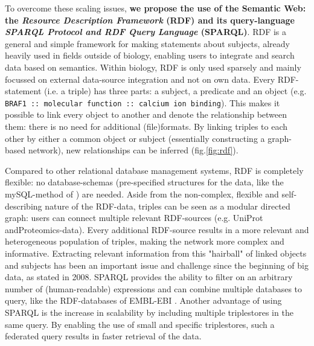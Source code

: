 \documentclass[twoside,fontsize=12pt]{article}
\begin{document}
\noindent
To overcome these scaling issues, \textbf{we propose the use of the Semantic Web: the \textit{Resource Description Framework} (RDF) and its query-language \textit{SPARQL Protocol and RDF Query Language} (SPARQL)}. RDF is a general and simple framework for making statements about subjects, already heavily used in fields outside of biology, enabling users to integrate and search data based on semantics. Within biology, RDF is only used sparsely and mainly focussed on external data-source integration and not on own data\cite{Belleau2008,Neumann2006,Sahoo2008}. Every RDF-statement (i.e. a triple) has three parts: a subject, a predicate and an object (e.g. \lstinline|BRAF1 :: molecular function :: calcium ion binding|). This makes it possible to link every object to another and denote the relationship between them: there is no need for additional (file)formats. By linking triples to each other by either a common object or subject (essentially constructing a graph-based network), new relationships can be inferred (fig.\ref{fig:rdf}). 

Compared to other relational database management systems, RDF is completely flexible: no database-schemas (pre-specified structures for the data, like the mySQL-method of \citet{Low2013}) are needed. Aside from the non-complex, flexible and self-describing nature of the RDF-data, triples can be seen as a modular directed graph: users can connect multiple relevant RDF-sources (e.g. UniProt andProteomics-data). Every additional RDF-source results in a more relevant and heterogeneous population of triples, making the network more complex and informative. Extracting relevant information from this "hairball" of linked objects and subjects has been an important issue and challenge since the beginning of big data, as \citet{Pavlopoulos2008} stated in 2008. SPARQL provides the ability to filter on an arbitrary number of (human-readable) expressions and can combine multiple databases to query, like the RDF-databases of EMBL-EBI \citep{Jupp2014}. Another advantage of using SPARQL is the increase in scalability by including multiple triplestores in the same query. By enabling the use of small and specific triplestores, such a federated query results in faster retrieval of the data.
\end{document}
